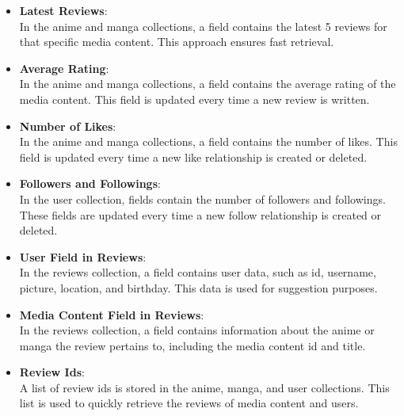 \begin{itemize}
    \item \textbf{Latest Reviews}: \\
    In the anime and manga collections, a field contains the latest 5 reviews for that specific media content. This approach ensures fast retrieval.

    \vspace{\baselineskip}

    \item \textbf{Average Rating}: \\
    In the anime and manga collections, a field contains the average rating of the media content. This field is updated every time a new review is written.

    \vspace{\baselineskip}

    \item \textbf{Number of Likes}: \\
    In the anime and manga collections, a field contains the number of likes. This field is updated every time a new like relationship is created or deleted.

    \vspace{\baselineskip}

    \item \textbf{Followers and Followings}: \\
    In the user collection, fields contain the number of followers and followings. These fields are updated every time a new follow relationship is created or deleted.

    \vspace{\baselineskip}

    \item \textbf{User Field in Reviews}: \\
    In the reviews collection, a field contains user data, such as id, username, picture, location, and birthday. This data is used for suggestion purposes.

    \vspace{\baselineskip}

    \item \textbf{Media Content Field in Reviews}: \\
    In the reviews collection, a field contains information about the anime or manga the review pertains to, including the media content id and title.

    \vspace{\baselineskip}

    \item \textbf{Review Ids}: \\
    A list of review ids is stored in the anime, manga, and user collections. This list is used to quickly retrieve the reviews of media content and users.
\end{itemize}

